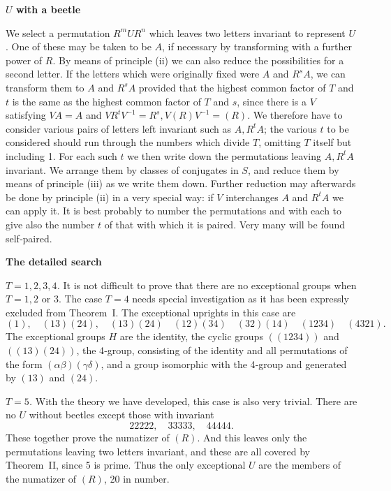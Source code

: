\documentclass[12pt]{article}
\begin{document}
\bigskip

\noindent
{\bf $U$ with a beetle}

\medskip

We select a permutation $R^m U R^n$ which leaves two letters invariant to represent $U$. One of these may be taken to be $A$, if necessary by transforming with a further power of $R$. By means of principle (ii) we can also reduce the possibilities for a second letter. If the letters which were originally fixed were $A$ and $R^s A$, we can transform them to $A$ and $R^s A$ provided that the highest common factor of $T$ and $t$ is the same as the highest common factor of $T$ and $s$, since there is a $V$ satisfying $V A = A$ and $V R^t V^{-1} = R^s, V(R) V^{-1} = (R)$. We therefore have to consider various pairs of letters left invariant such as $A, R^t A$; the various $t$ to be considered should run through the numbers which divide $T$, omitting $T$ itself but including 1. For each such $t$ we then write down the permutations leaving $A, R^t A$ invariant. We arrange them by classes of conjugates in $S$, and reduce them by means of principle (iii) as we write them down. Further reduction may afterwards be done by principle (ii) in a very special way: if $V$ interchanges $A$ and $R^t A$ we can apply it. It is best probably to number the permutations and with each to give also the number $t$ of that with which it is paired. Very many will be found self‐paired.

\bigskip

\noindent
{\bf The detailed search}

\medskip

\noindent
{\em $T = 1, 2, 3, 4$.} 
It is not difficult to prove that there are no exceptional groups when $T = 1, 2$ or $3$. The case $T = 4$ needs special investigation as it has been expressly excluded from Theorem~I. The exceptional uprights in this case are
\[
(1),\quad (13)(24),\quad (13)(24) \quad
(12)(34)\quad (32)(14)\quad (1234)\quad (4321).
\]
The exceptional groups $H$ are the identity, the cyclic groups $((1234))$ and $((13)(24))$, the 4‐group, consisting of the identity and all permutations of the form $(\alpha\beta)(\gamma\delta)$, and a group isomorphic with the 4‐group and generated by $(13)$ and $(24)$.

\medskip

\noindent
{\em $T = 5$.}
With the theory we have developed, this case is also very trivial. There are no $U$ without beetles except those with invariant 
\[
22222,\quad 33333,\quad 44444.
\]
These together prove the numatizer of $(R)$. And this leaves only the permutations leaving two letters invariant, and these are all covered by Theorem~II, since 5 is prime. Thus the only exceptional $U$ are the members of the numatizer of $(R)$, 20 in number.
\end{document}
